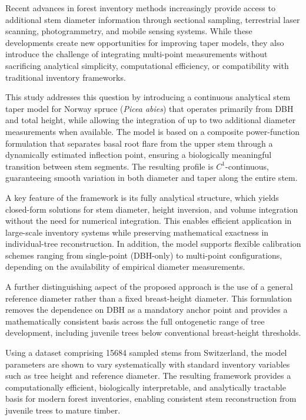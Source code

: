 \documentclass[twocolumn, bibliography=totoc]{scrartcl}
\begin{document}
Recent advances in forest inventory methods increasingly provide access to additional stem diameter information through sectional sampling, terrestrial laser scanning, photogrammetry, and mobile sensing systems. While these developments create new opportunities for improving taper models, they also introduce the challenge of integrating multi-point measurements without sacrificing analytical simplicity, computational efficiency, or compatibility with traditional inventory frameworks.

This study addresses this question by introducing a continuous analytical stem taper model for Norway spruce (\textit{Picea abies}) that operates primarily from DBH and total height, while allowing the integration of up to two additional diameter measurements when available. The model is based on a composite power-function formulation that separates basal root flare from the upper stem through a dynamically estimated inflection point, ensuring a biologically meaningful transition between stem segments. The resulting profile is $C^1$-continuous, guaranteeing smooth variation in both diameter and taper along the entire stem.

A key feature of the framework is its fully analytical structure, which yields closed-form solutions for stem diameter, height inversion, and volume integration without the need for numerical integration. This enables efficient application in large-scale inventory systems while preserving mathematical exactness in individual-tree reconstruction. In addition, the model supports flexible calibration schemes ranging from single-point (DBH-only) to multi-point configurations, depending on the availability of empirical diameter measurements.

A further distinguishing aspect of the proposed approach is the use of a general reference diameter rather than a fixed breast-height diameter. This formulation removes the dependence on DBH as a mandatory anchor point and provides a mathematically consistent basis across the full ontogenetic range of tree development, including juvenile trees below conventional breast-height thresholds.

Using a dataset comprising \num{15684} sampled stems from Switzerland, the model parameters are shown to vary systematically with standard inventory variables such as tree height and reference diameter. The resulting framework provides a computationally efficient, biologically interpretable, and analytically tractable basis for modern forest inventories, enabling consistent stem reconstruction from juvenile trees to mature timber.
\end{document}
